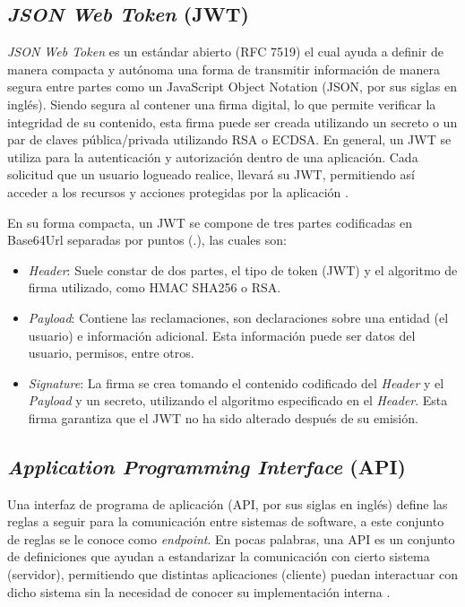 \subsection{\textit{JSON Web Token} (JWT)}
\textit{JSON Web Token} es un estándar abierto (RFC 7519) el cual ayuda a definir de manera compacta y autónoma una forma de
transmitir información de manera segura entre partes como un JavaScript Object Notation (JSON, por sus siglas en inglés). Siendo
segura al contener una firma digital, lo que permite verificar la integridad de su contenido, esta firma puede ser creada
utilizando un secreto o un par de claves pública/privada utilizando RSA o ECDSA. En general, un JWT se utiliza para la
autenticación y autorización dentro de una aplicación. Cada solicitud que un usuario logueado realice, llevará su JWT,
permitiendo así acceder a los recursos y acciones protegidas por la aplicación \cite{auth02024jwt}.

En su forma compacta, un JWT se compone de tres partes codificadas en Base64Url separadas por puntos (.), las cuales son:
\begin{itemize}
    \item \textit{Header}: Suele constar de dos partes, el tipo de token (JWT) y el algoritmo de firma utilizado, como HMAC SHA256 o RSA.
    \item \textit{Payload}: Contiene las reclamaciones, son declaraciones sobre una entidad (el usuario) e información adicional.
            Esta información puede ser datos del usuario, permisos, entre otros.
    \item \textit{Signature}: La firma se crea tomando el contenido codificado del \textit{Header} y el \textit{Payload} y un
            secreto, utilizando el algoritmo especificado en el \textit{Header}. Esta firma garantiza que el JWT no ha sido alterado
            después de su emisión.
\end{itemize}

\subsection{\textit{Application Programming Interface} (API)}
Una interfaz de programa de aplicación (API, por sus siglas en inglés) define las reglas a seguir para la comunicación entre
sistemas de software, a este conjunto de reglas se le conoce como \textit{\gls{endpoint}}. En pocas palabras, una API es un
conjunto de definiciones que ayudan a estandarizar la comunicación con cierto sistema (servidor), permitiendo que distintas 
aplicaciones (cliente) puedan interactuar con dicho sistema sin la necesidad de conocer su implementación interna 
\cite{aws2025restfulAPI}.


